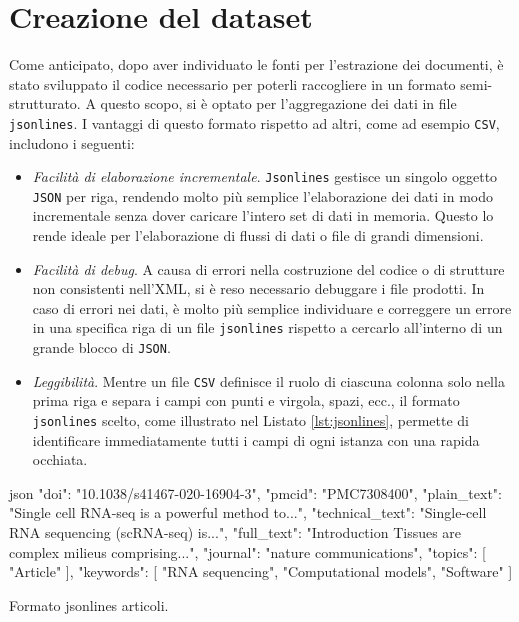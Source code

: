 \documentclass[12pt,a4paper,twoside,openright]{book}
\begin{document}
\section{Creazione del dataset}
Come anticipato,  dopo aver individuato le fonti per l'estrazione dei documenti, è stato sviluppato il codice necessario per poterli raccogliere in un formato semi-strutturato. A questo scopo, si è optato per l'aggregazione dei dati in file \texttt{jsonlines}. I vantaggi di questo formato rispetto ad altri, come ad esempio \texttt{CSV}, includono i seguenti:
\begin{itemize}
    \item \emph{Facilità di elaborazione incrementale}. \texttt{Jsonlines} gestisce un singolo oggetto \texttt{JSON} per riga, rendendo molto più semplice l'elaborazione dei dati in modo incrementale senza dover caricare l'intero set di dati in memoria. Questo lo rende ideale per l'elaborazione di flussi di dati o file di grandi dimensioni.
    \item \emph{Facilità di debug}. A causa di errori nella costruzione del codice o di strutture non consistenti nell'XML, si è reso necessario debuggare i file prodotti. In caso di errori nei dati, è molto più semplice individuare e correggere un errore in una specifica riga di un file \texttt{jsonlines} rispetto a cercarlo all'interno di un grande blocco di \texttt{JSON}. 
    \item \emph{Leggibilità}. Mentre un file \texttt{CSV} definisce il ruolo di ciascuna colonna solo nella prima riga e separa i campi con punti e virgola, spazi, ecc., il formato \texttt{jsonlines} scelto, come illustrato nel Listato \ref{lst:jsonlines}, permette di identificare immediatamente tutti i campi di ogni istanza con una rapida occhiata.
\end{itemize}

\begin{customcode}
\begin{mintedbox}{json}
{
    "doi": "10.1038/s41467-020-16904-3", 
    "pmcid": "PMC7308400",  
    "plain_text": "Single cell RNA-seq is a powerful method to...", 
    "technical_text": "Single-cell RNA sequencing (scRNA-seq) is...", 
    "full_text": "Introduction Tissues are complex milieus comprising...", 
    "journal": "nature communications", 
    "topics": [ "Article" ], 
    "keywords": [ "RNA sequencing", "Computational models", "Software" ]
}    
\end{mintedbox}
\caption{Formato jsonlines articoli.}
\label{lst:jsonlines}
\end{customcode}
\end{document}
